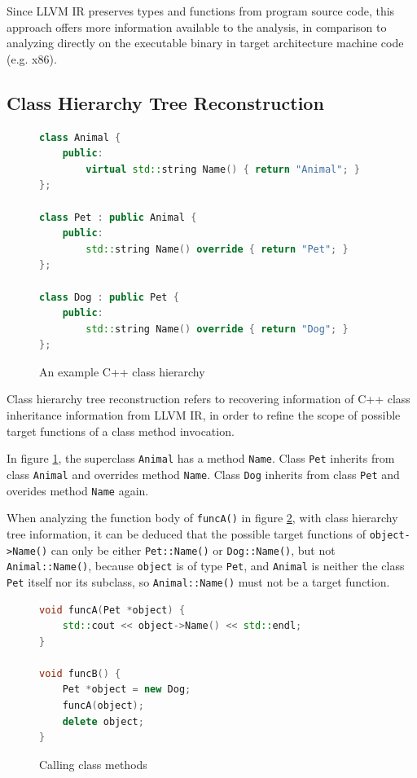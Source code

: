 \documentclass[12pt]{article}
\begin{document}
Since LLVM IR preserves types and functions from program source code, this approach offers more information available to the analysis, in comparison to analyzing directly on the executable binary in target architecture machine code (e.g. x86).

\subsection{Class Hierarchy Tree Reconstruction}
\label{subsection:class-tree}

\begin{figure}[t]
    \centering
    \begin{lstlisting}[language=c++]
class Animal {
    public:
        virtual std::string Name() { return "Animal"; }
};

class Pet : public Animal {
    public:
        std::string Name() override { return "Pet"; }
};

class Dog : public Pet {
    public:
        std::string Name() override { return "Dog"; }
};
    \end{lstlisting}
    \caption{An example C++ class hierarchy}
    \label{fig:class-hierarchy}
\end{figure}

Class hierarchy tree reconstruction refers to recovering information of C++ class inheritance information from LLVM IR, in order to refine the scope of possible target functions of a class method invocation.

In figure \ref{fig:class-hierarchy}, the superclass \texttt{Animal} has a method \texttt{Name}. Class \texttt{Pet} inherits from class \texttt{Animal} and overrides method \texttt{Name}. Class \texttt{Dog} inherits from class \texttt{Pet} and overides method \texttt{Name} again.


When analyzing the function body of \texttt{funcA()} in figure \ref{fig:class-caller}, with class hierarchy tree information, it can be deduced that the possible target functions of \texttt{object->Name()} can only be either \texttt{Pet::Name()} or \texttt{Dog::Name()}, but not \texttt{Animal::Name()}, because \texttt{object} is of type \texttt{Pet}, and \texttt{Animal} is neither the class \texttt{Pet} itself nor its subclass, so \texttt{Animal::Name()} must not be a target function.

\begin{figure}[H]
    \centering
    \begin{lstlisting}[language=c++]
void funcA(Pet *object) {
    std::cout << object->Name() << std::endl;
}

void funcB() {
    Pet *object = new Dog;
    funcA(object);
    delete object;
}
    \end{lstlisting}
    \caption{Calling class methods}
    \label{fig:class-caller}
\end{figure}
\end{document}
